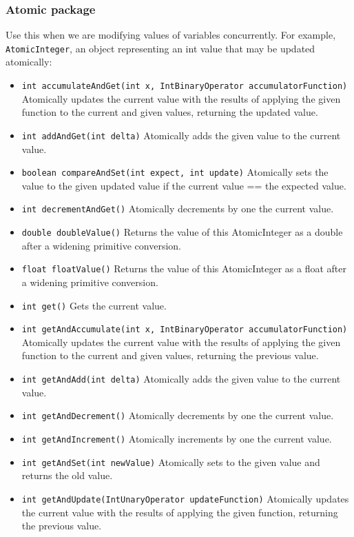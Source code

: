 \documentclass{article}
\begin{document}
\subsubsection{Atomic package}
Use this when we are modifying values of variables concurrently. For example, \lstinline{AtomicInteger}, an object representing an int value that may be updated atomically:
\begin{itemize}
    \item \lstinline{int accumulateAndGet(int x, IntBinaryOperator accumulatorFunction)} Atomically updates the current value with the results of applying the given function to the current and given values, returning the updated value.
    \item \lstinline{int addAndGet(int delta)} Atomically adds the given value to the current value.
    \item \lstinline{boolean compareAndSet(int expect, int update)} Atomically sets the value to the given updated value if the current value == the expected value.
    \item \lstinline{int decrementAndGet()} Atomically decrements by one the current value.
    \item \lstinline{double doubleValue()} Returns the value of this AtomicInteger as a double after a widening primitive conversion.
    \item \lstinline{float floatValue()} Returns the value of this AtomicInteger as a float after a widening primitive conversion.
    \item \lstinline{int get()} Gets the current value.
    \item \lstinline{int getAndAccumulate(int x, IntBinaryOperator accumulatorFunction)} Atomically updates the current value with the results of applying the given function to the current and given values, returning the previous value.
    \item \lstinline{int getAndAdd(int delta)} Atomically adds the given value to the current value.
    \item \lstinline{int getAndDecrement()} Atomically decrements by one the current value.
    \item \lstinline{int getAndIncrement()} Atomically increments by one the current value.
    \item \lstinline{int getAndSet(int newValue)} Atomically sets to the given value and returns the old value.
    \item \lstinline{int getAndUpdate(IntUnaryOperator updateFunction)} Atomically updates the current value with the results of applying the given function, returning the previous value.

\end{itemize}
\end{document}
